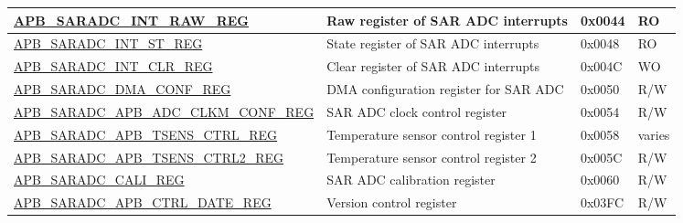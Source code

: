 \begin{longtable}{ | p{7cm} | p{5.2cm} | p{1.3cm} | p{1cm} | }
\hyperref[regdesc:APBSARADCINTRAWREG]{APB\_SARADC\_INT\_RAW\_REG} & Raw register of SAR ADC interrupts & 0x0044 & RO \\ \hline
\hyperref[regdesc:APBSARADCINTSTREG]{APB\_SARADC\_INT\_ST\_REG} & State register of SAR ADC interrupts & 0x0048 & RO \\ \hline
\hyperref[regdesc:APBSARADCINTCLRREG]{APB\_SARADC\_INT\_CLR\_REG} & Clear register of SAR ADC interrupts & 0x004C & WO \\ \hline
\hyperref[regdesc:APBSARADCDMACONFREG]{APB\_SARADC\_DMA\_CONF\_REG} & DMA configuration register for SAR ADC & 0x0050 & R/W \\ \hline
\hyperref[regdesc:APBSARADCCLKMCONFREG]{APB\_SARADC\_APB\_ADC\_CLKM\_CONF\_REG} & SAR ADC clock control register & 0x0054 & R/W \\ \hline
\hyperref[regdesc:APBSARADCAPBTSENSCTRLREG]{APB\_SARADC\_APB\_TSENS\_CTRL\_REG} & Temperature sensor control register 1 & 0x0058 & varies \\ \hline
\hyperref[regdesc:APBSARADCTSENSCTRL2REG]{APB\_SARADC\_APB\_TSENS\_CTRL2\_REG} & Temperature sensor control register 2 & 0x005C & R/W \\ \hline
\hyperref[regdesc:APBSARADCCALIREG]{APB\_SARADC\_CALI\_REG} & SAR ADC calibration register & 0x0060 & R/W \\ \hline
\hyperref[regdesc:APBSARADCCTRLDATEREG]{APB\_SARADC\_APB\_CTRL\_DATE\_REG} & Version control register & 0x03FC & R/W \\ \hline
\end{longtable}
